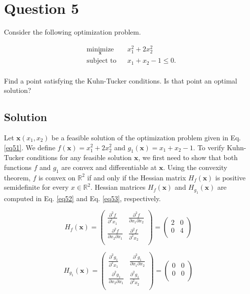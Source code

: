 \section*{Question 5}

Consider the following optimization problem.

\begin{equation}
\begin{aligned}
& \underset{\mathbf{x}}{\text{minimize}} & & x_1^2 + 2x_2^2\\
& \text{subject to} & & x_1 + x_2 - 1 \leqslant 0.\\
\end{aligned}
\label{eq51}
\end{equation}

Find a point satisfying the Kuhn-Tucker conditions. Is that point an optimal solution?

\subsection*{Solution}

Let $\mathbf{x}(x_1, x_2)$ be a feasible solution of the optimization problem given in Eq. \ref{eq51}. We define $f(\mathbf{x}) = x_1^2 + 2x_2^2$ and $g_1(\mathbf{x}) = x_1 + x_2 - 1$. To verify Kuhn-Tucker conditions for any feasible solution $\mathbf{x}$, we first need to show that both functions $f$ and $g_1$ are convex and differentiable at $\mathbf{x}$. Using the convexity theorem, $f$ is convex on $\mathbb{R}^2$ if and only if the Hessian matrix $H_f(\mathbf{x})$ is positive semidefinite for every $x\in \mathbb{R}^2$. Hessian matrices $H_f(\mathbf{x})$ and $H_{g_1}(\mathbf{x})$ are computed in Eq. \ref{eq52} and Eq. \ref{eq53}, respectively.

\begin{equation}
H_f(\mathbf{x})
= \begin{pmatrix}
\frac{\partial^2 f}{\partial^2 x_1} & \frac{\partial^2 f}{\partial x_1 \partial x_2}\\[0.6em]
\frac{\partial^2 f}{\partial x_2 \partial x_1} & \frac{\partial^2 f}{\partial^2 x_2}\\
\end{pmatrix}
= \begin{pmatrix}
2 & 0\\[0.6em]
0 & 4\\
\end{pmatrix}
\label{eq52}
\end{equation}

\begin{equation}
H_{g_1}(\mathbf{x})
= \begin{pmatrix}
\frac{\partial^2 g_1}{\partial^2 x_1} & \frac{\partial^2 g_1}{\partial x_1 \partial x_2}\\[0.6em]
\frac{\partial^2 g_1}{\partial x_2 \partial x_1} & \frac{\partial^2 g_1}{\partial^2 x_2}\\
\end{pmatrix}
= \begin{pmatrix}
0 & 0\\[0.6em]
0 & 0\\
\end{pmatrix}
\label{eq53}
\end{equation}

